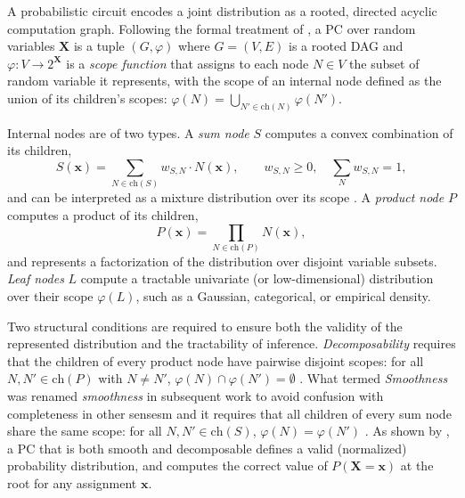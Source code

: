 A probabilistic circuit encodes a joint distribution as a rooted, directed acyclic computation graph.
Following the formal treatment of \cite{Peharz2015OnTP}, a PC over random variables $\mathbf{X}$ is a tuple $(G, \varphi)$ where $G=(V,E)$ is a rooted DAG and $\varphi:V\to2^{\mathbf{X}}$ is a \emph{scope function} that assigns to each node $N \in V$ the subset of random variable it represents, with the scope of an internal node defined as the union of its children's scopes:
$\varphi(N)=\bigcup_{N' \in \mathrm{ch}(N)} \varphi(N')$.

Internal nodes are of two types. A \emph{sum node} $S$ computes a convex combination of its children,
\begin{equation}
  S(\mathbf{x}) = \sum_{N \in \mathrm{ch}(S)} w_{S,N} \cdot N(\mathbf{x}),
  \qquad w_{S,N} \geq 0,\quad \sum_{N} w_{S,N} = 1,
  \label{eq:sum-node}
\end{equation}
and can be interpreted as a mixture distribution over its scope \cite{Poon2011SumproductNA}.
A \emph{product node} $P$ computes a product of its children,
\begin{equation}
  P(\mathbf{x}) = \prod_{N \in \mathrm{ch}(P)} N(\mathbf{x}),
  \label{eq:product-node}
\end{equation}
and represents a factorization of the distribution over disjoint variable
subsets.
\emph{Leaf nodes} $L$ compute a tractable univariate (or low-dimensional)
distribution over their scope $\varphi(L)$, such as a Gaussian, categorical,
or empirical density.

Two structural conditions are required to ensure both the validity of the represented distribution and the tractability of inference.
\emph{Decomposability} requires that the children of every product node have pairwise disjoint scopes: for all $N, N'\in \mathrm{ch}(P)$ with $N\neq N'$, $\varphi(N)\cap \varphi(N')=\emptyset$ \cite{Peharz2015OnTP, Darwiche2001DecomposableNN}.
What \textcite{Poon2011SumproductNA} termed \emph{Smoothness} was renamed \emph{smoothness} in subsequent work \textcite{Peharz2015OnTP} to avoid confusion with completeness in other sensesm and it requires that all children of every sum node share the same scope: for all $N, N' \in \mathrm{ch}(S)$, $\varphi(N)=\varphi(N')$ \cite{Poon2011SumproductNA, Peharz2015OnTP}.
As shown by \textcite{Peharz2015OnTP}, a PC that is both smooth and decomposable defines a valid (normalized) probability distribution, and computes the correct value of $P(\mathbf{X}=\mathbf{x})$ at the root for any assignment $\mathbf{x}$.


